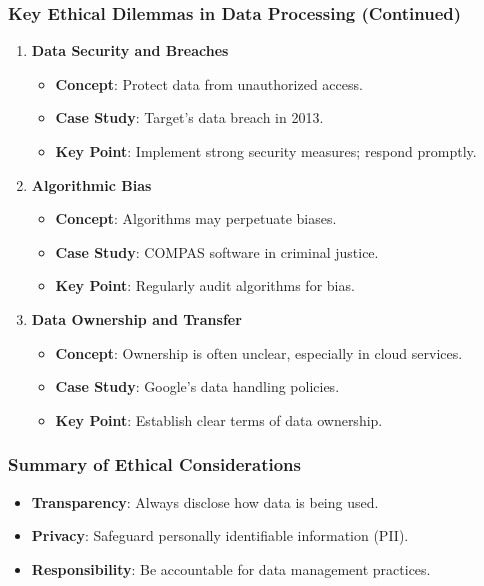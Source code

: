 \documentclass{beamer}
\begin{document}
\begin{frame}[fragile]
    \frametitle{Key Ethical Dilemmas in Data Processing (Continued)}
    \begin{enumerate}[resume]
        \item \textbf{Data Security and Breaches}
        \begin{itemize}
            \item \textbf{Concept}: Protect data from unauthorized access.
            \item \textbf{Case Study}: Target's data breach in 2013.
            \item \textbf{Key Point}: Implement strong security measures; respond promptly.
        \end{itemize}

        \item \textbf{Algorithmic Bias}
        \begin{itemize}
            \item \textbf{Concept}: Algorithms may perpetuate biases.
            \item \textbf{Case Study}: COMPAS software in criminal justice.
            \item \textbf{Key Point}: Regularly audit algorithms for bias.
        \end{itemize}

        \item \textbf{Data Ownership and Transfer}
        \begin{itemize}
            \item \textbf{Concept}: Ownership is often unclear, especially in cloud services.
            \item \textbf{Case Study}: Google's data handling policies.
            \item \textbf{Key Point}: Establish clear terms of data ownership.
        \end{itemize}
    \end{enumerate}
\end{frame}

\begin{frame}[fragile]
    \frametitle{Summary of Ethical Considerations}
    \begin{itemize}
        \item \textbf{Transparency}: Always disclose how data is being used.
        \item \textbf{Privacy}: Safeguard personally identifiable information (PII).
        \item \textbf{Responsibility}: Be accountable for data management practices.
    \end{itemize}
\end{frame}
\end{document}
